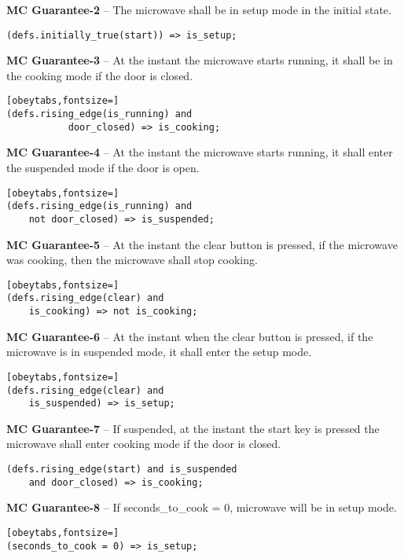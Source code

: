 \begin{requirement}
\textbf{MC Guarantee-2} -- The microwave shall be in setup mode in the initial
state.
\begin{verbatim}
(defs.initially_true(start)) => is_setup;
\end{verbatim}
\label{req:mic2}
\end{requirement}
%
\begin{requirement}
\textbf{MC Guarantee-3} -- At the instant the microwave starts running, it shall
be in the cooking mode if the door is closed.
\begin{Verbatim}[obeytabs,fontsize=]
(defs.rising_edge(is_running) and
	       door_closed) => is_cooking;
\end{Verbatim}
\label{req:mic3}
\end{requirement}
%
\begin{requirement}
\textbf{MC Guarantee-4} -- At the instant the microwave starts running, it shall
enter the suspended mode if the door is open.
\begin{Verbatim}[obeytabs,fontsize=]
(defs.rising_edge(is_running) and
	not door_closed) => is_suspended;
\end{Verbatim}
\label{req:mic4}
\end{requirement}
%
\begin{requirement}
\textbf{MC Guarantee-5} -- At the instant the clear button is pressed, if the
microwave was cooking, then the microwave shall stop cooking.
\begin{Verbatim}[obeytabs,fontsize=]
(defs.rising_edge(clear) and
	is_cooking) => not is_cooking;
\end{Verbatim}
\label{req:mic5}
\end{requirement}
%
\begin{requirement}
\textbf{MC Guarantee-6} -- At the instant when the clear button is pressed, if
the microwave is in suspended mode, it shall enter the setup mode.
\begin{Verbatim}[obeytabs,fontsize=]
(defs.rising_edge(clear) and
	is_suspended) => is_setup;
\end{Verbatim}
\label{req:mic6}
\end{requirement}
%
\begin{requirement}
\textbf{MC Guarantee-7} -- If suspended, at the instant the start key is pressed
the microwave shall enter cooking mode if the door is closed.
\begin{Verbatim}[obeytabs]
(defs.rising_edge(start) and is_suspended
	and door_closed) => is_cooking;
\end{Verbatim}
\label{req:mic7}
\end{requirement}
%
\begin{requirement}
\textbf{MC Guarantee-8} -- If seconds\_to\_cook = 0, microwave will be in setup
mode.
\begin{Verbatim}[obeytabs,fontsize=]
(seconds_to_cook = 0) => is_setup;
\end{Verbatim}
\label{req:mic8}
\end{requirement}

